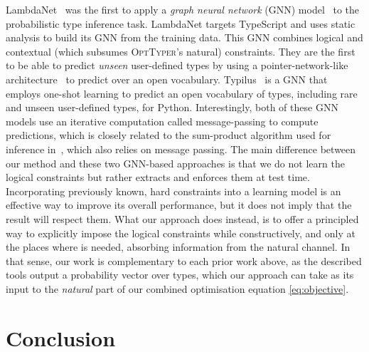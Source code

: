 \documentclass[acmsmall, review, anonymous]{acmart}\settopmatter{printfolios=true,printccs=false,printacmref=false}
\newcommand{\projectname}{\textsc{OptTyper}\xspace}
\begin{document}
LambdaNet~\citep{wei20} was the first to apply a \emph{graph neural network} (GNN) model~\citep{Gilmer2017-qd,allamanis17a} to the probabilistic type inference task.
LambdaNet targets TypeScript and uses static analysis to build its GNN from the training data. 
This GNN combines logical and contextual (which subsumes \projectname's natural) constraints.
They are the first to be able to predict \emph{unseen} user-defined types by using a pointer-network-like architecture~\citep{vinyals15,Allamanis2016-su} to predict over an open vocabulary.
Typilus~\citep{allamanis20} is a GNN that employs one-shot learning to predict an open vocabulary of types, including rare and unseen user-defined types, for Python. 
Interestingly, both of these GNN models use an iterative
computation called message-passing to compute predictions,
which is closely related to the sum-product algorithm
used for inference in~\cite{xu16}, which also relies on message passing.
The main difference between our method and these two GNN-based approaches is that we do not learn the logical constraints but rather extracts and enforces them at test time.
Incorporating previously known, hard constraints into a learning
model is an effective way to improve its overall performance, but it does not imply that the result will respect them. What our approach does instead, is to offer a principled way to explicitly impose the logical constraints while constructively, 
and only at the places where is needed, absorbing information from the natural channel. In that sense, our work is complementary to each prior work above, as the described tools output
a probability vector over types, which our approach can take as its input to the
\textit{natural} part of our combined optimisation equation \eqref{eq:objective}.

\section{Conclusion}~\label{sec:conclusion}
\end{document}
